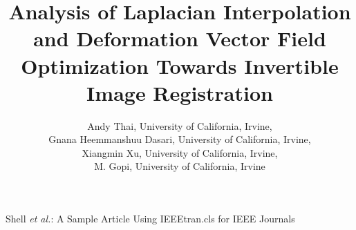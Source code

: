 \documentclass[lettersize,journal]{IEEEtran}
\begin{document}
\title{Analysis of Laplacian Interpolation and Deformation Vector Field Optimization Towards Invertible Image Registration}

\author{
        {Andy Thai, University of California, Irvine},

        {Gnana Heemmanshuu Dasari, University of California, Irvine},

        {Xiangmin Xu, University of California, Irvine},
        
        {M. Gopi, University of California, Irvine}
}

%
{Shell \MakeLowercase{\textit{et al.}}: A Sample Article Using IEEEtran.cls for IEEE Journals}


\maketitle
\end{document}
